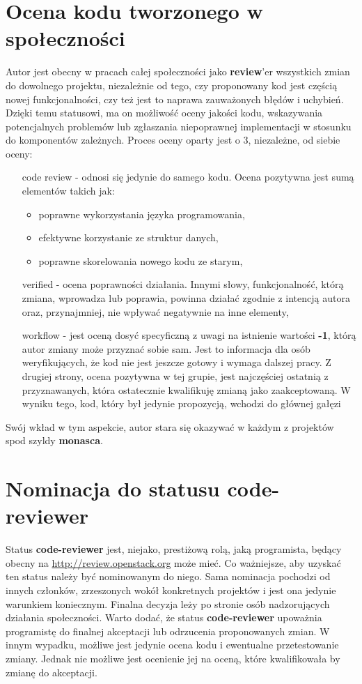 \section{Ocena kodu tworzonego w społeczności}
    Autor jest obecny w pracach całej społeczności jako \textbf{review}'er wszystkich zmian do dowolnego projektu, 
    niezależnie od tego, czy proponowany kod jest częścią nowej funkcjonalności, czy też jest to naprawa zauważonych błędów i 
    uchybień. Dzięki temu statusowi, ma on możliwość oceny jakości kodu, wskazywania potencjalnych problemów lub zgłaszania 
    niepoprawnej implementacji w stosunku do komponentów zależnych.
    Proces oceny oparty jest o 3, niezależne, od siebie oceny:
    \begin{itemize}
        \item[code review] - odnosi się jedynie do samego kodu. Ocena pozytywna jest sumą elementów takich jak:
        \begin{itemize}
            \item poprawne wykorzystania języka programowania,
            \item efektywne korzystanie ze struktur danych,
            \item poprawne skorelowania nowego kodu ze starym,
        \end{itemize}
        \item[verified] -  ocena poprawności działania. Innymi słowy, funkcjonalność, którą zmiana, wprowadza lub poprawia, powinna działać
        zgodnie z intencją autora oraz, przynajmniej, nie wpływać negatywnie na inne elementy,
        \item[workflow] - jest oceną dosyć specyficzną z uwagi na istnienie wartości \textbf{-1}, którą autor zmiany może przyznać sobie sam.
        Jest to informacja dla osób weryfikujących, że kod nie jest jeszcze gotowy i wymaga dalszej pracy. Z drugiej strony, ocena pozytywna w tej grupie,
        jest najczęściej ostatnią z przyznawanych, która ostatecznie kwalifikuję zmianą jako zaakceptowaną. W wyniku tego, kod, który był
        jedynie propozycją, wchodzi do głównej gałęzi
    \end{itemize}
    Swój wkład w tym aspekcie, autor stara się okazywać w każdym z projektów spod szyldy \textbf{monasca}.

\section{Nominacja do statusu code-reviewer}
    Status \textbf{code-reviewer} jest, niejako, prestiżową rolą, jaką programista, będący obecny na 
    \url{http://review.openstack.org} może mieć. Co ważniejsze, aby uzyskać ten status należy być nominowanym do niego. Sama 
    nominacja pochodzi od innych członków, zrzeszonych wokół konkretnych projektów i jest ona jedynie warunkiem koniecznym. 
    Finalna decyzja leży po stronie osób nadzorujących działania społeczności.
    Warto dodać, że status \textbf{code-reviewer} upoważnia programistę do finalnej akceptacji lub odrzucenia proponowanych 
    zmian. W innym wypadku, możliwe jest jedynie ocena kodu i ewentualne przetestowanie zmiany. Jednak nie możliwe jest 
    ocenienie jej na oceną, które kwalifikowała by zmianę do akceptacji.